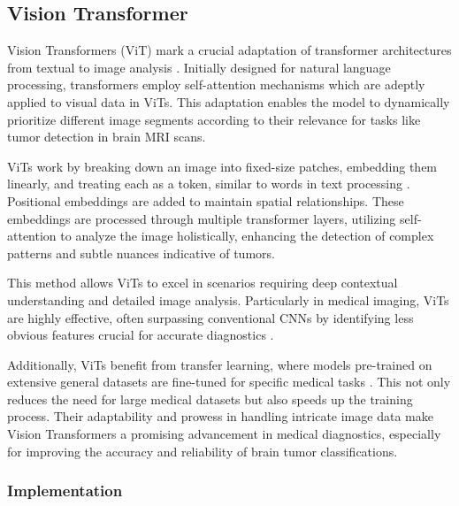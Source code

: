 \subsection{Vision Transformer}\label{vit}

Vision Transformers (ViT) mark a crucial adaptation of transformer architectures from textual to image analysis \cite{Khan2021Transformers}. Initially designed for natural language processing, transformers employ self-attention mechanisms which are adeptly applied to visual data in ViTs. This adaptation enables the model to dynamically prioritize different image segments according to their relevance for tasks like tumor detection in brain MRI scans.

ViTs work by breaking down an image into fixed-size patches, embedding them linearly, and treating each as a token, similar to words in text processing \cite{Wu2020Visual}. Positional embeddings are added to maintain spatial relationships. These embeddings are processed through multiple transformer layers, utilizing self-attention to analyze the image holistically, enhancing the detection of complex patterns and subtle nuances indicative of tumors.

This method allows ViTs to excel in scenarios requiring deep contextual understanding and detailed image analysis. Particularly in medical imaging, ViTs are highly effective, often surpassing conventional CNNs by identifying less obvious features crucial for accurate diagnostics \cite{Matsoukas2021Is}.

Additionally, ViTs benefit from transfer learning, where models pre-trained on extensive general datasets are fine-tuned for specific medical tasks \cite{Simon2022Vision}. This not only reduces the need for large medical datasets but also speeds up the training process. Their adaptability and prowess in handling intricate image data make Vision Transformers a promising advancement in medical diagnostics, especially for improving the accuracy and reliability of brain tumor classifications.


\subsubsection{Implementation}

